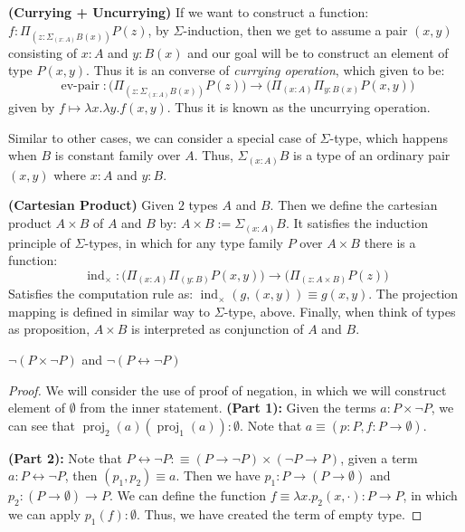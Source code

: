 \begin{remark}{\textbf{(Currying + Uncurrying)}}
    If we want to construct a function: $f:\Pi_{(z:\Sigma_{(x:A)}B(x))}P(z)$, by $\Sigma$-induction, then we get to assume a pair $(x,y)$ consisting of $x:A$ and $y:B(x)$ and our goal will be to construct an element of type $P(x,y)$. Thus it is an converse of \textit{currying operation}, which given to be:
    \begin{equation*}
        \operatorname{ev-pair} : \Big( \Pi_{(z:\Sigma_{(x:A)}B(x))}P(z) \Big) \rightarrow \Big( \Pi_{(x:A)}\Pi_{y:B(x)}P(x,y) \Big)
    \end{equation*}
    given by $f\mapsto\lambda x.\lambda y.f(x,y)$. Thus it is known as the uncurrying operation.
\end{remark}

Similar to other cases, we can consider a special case of $\Sigma$-type, which happens when $B$ is constant family over $A$. Thus, $\Sigma_{(x:A)}B$ is a type of an ordinary pair $(x,y)$ where $x:A$ and $y:B$.

\begin{definition}{\textbf{(Cartesian Product)}}
    Given $2$ types $A$ and $B$. Then we define the cartesian product $A\times B$ of $A$ and $B$ by: $A\times B := \Sigma_{(x:A)}B$. It satisfies the induction principle of $\Sigma$-types, in which for any type family $P$ over $A\times B$ there is a function:
    \begin{equation*}
        \operatorname{ind}_\times:\Big( \Pi_{(x:A)}\Pi_{(y:B)}P(x,y) \Big)\rightarrow\Big( \Pi_{(z:A\times B)}P(z) \Big)
    \end{equation*}
    Satisfies the computation rule as: $\operatorname{ind}_\times(g,(x,y))\equiv g(x,y)$. The projection mapping is defined in similar way to $\Sigma$-type, above. Finally, when think of types as proposition, $A\times B$ is interpreted as conjunction of $A$ and $B$.
\end{definition}

\begin{proposition}
    $\neg(P\times \neg P)$ and $\neg(P\leftrightarrow\neg P)$
\end{proposition}
\begin{proof}
    We will consider the use of proof of negation, in which we will construct element of $\emptyset$ from the inner statement.
    \textbf{(Part 1):} Given the terms $a:P\times \neg P$, we can see that $\operatorname{proj}_2(a)(\operatorname{proj}_1(a)):\emptyset$. Note that $a\equiv(p:P, f:P\to\emptyset)$.

    {\color{violet} \textbf{(Part 2):} Note that} $P\leftrightarrow\neg P:\equiv(P\to\neg P)\times(\neg P\to P)$, given a term $a:P\leftrightarrow\neg P$, then $(p_1,p_2)\equiv a$. Then we have $p_1:P\to(P\to\emptyset)$ and $p_2:(P\to\emptyset)\to P$. We can define the function $f\equiv\lambda x.p_2(x, \cdot):P\to P$, in which we can apply $p_1(f):\emptyset$. Thus, we have created the term of empty type.
\end{proof}

